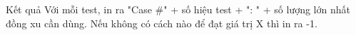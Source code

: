 Kết quả
Với mỗi test, in ra "Case \#" + số hiệu test + ": " + số lượng lớn nhất đồng xu cần dùng. Nếu không có cách nào để đạt giá trị X thì in ra -1.